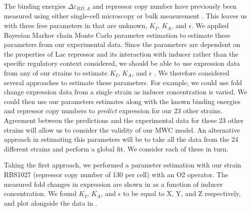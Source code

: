 The binding energies $\Delta \varepsilon_{RD,A}$ and repressor copy number have previously been measured using either single-cell microscopy or bulk measurement \cite{Oehler1994,Vilar2003,Garcia2011, Brewster2014}. This leaves us with three free parameters in \eref[eq7] that are unknown, $K_I$, $K_A$, and $\epsilon$. We applied Bayesian Markov chain Monte Carlo parameter estimation to estimate these parameters from our experimental data. Since the parameters are dependent on the properties of Lac repressor and its interaction with inducer rather than the specific regulatory context considered, we should be able to use expression data from any of our strains to estimate $K_I$, $K_A$, and $\epsilon$ . We therefore considered several approaches to estimate these parameters.
For example, we could use fold change expression data from a single strain as inducer concentration is varied. We could then use our parameters estimates along with the known binding energies and repressor copy numbers to \textit{predict} expression for our 23 other strains. Agreement between the predictions and the experimental data for these 23 other strains will allow us to consider the validity of our MWC model. An alternative approach in estimating this parameters will be to take all the data from the 24 different strains and perform a global fit. We consider each of these in turn.


Taking the first approach, we performed a parameter estimation with our strain RBS1027 (repressor copy number of 130 per cell) with an O2 operator. The measured fold changes in expression are shown in  as a function of inducer concentration. We found $K_I$, $K_A$, and $\epsilon$ to be equal to X, Y, and Z respectively, and plot \eref[eq7] alongside the data in . 

